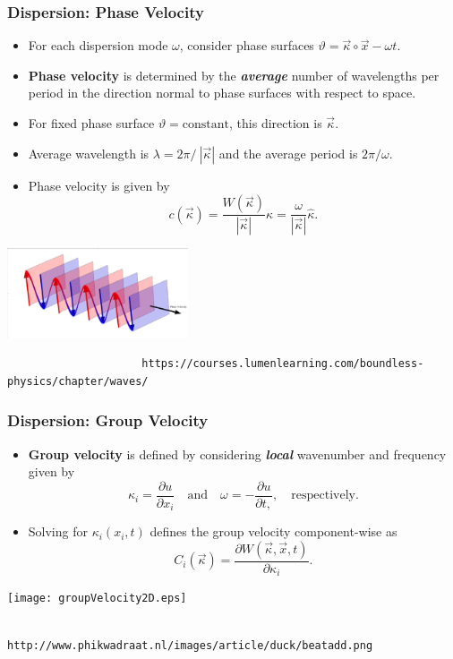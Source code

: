 \documentclass{beamer}
\begin{document}
\begin{frame}[fragile]
\frametitle{\textbf{Dispersion:} Phase Velocity}
\begin{itemize}
\item For each dispersion mode $\omega$, consider phase surfaces $\vartheta=\vec{\kappa}\circ\vec{x}-\omega t$.
\item \textbf{Phase velocity} is determined by the \textbf{\textit{average}} number of wavelengths per period in the direction normal to phase surfaces with respect to space.\item For fixed phase surface $\vartheta=\mbox{constant}$, this direction is $\vec{\kappa}$.
\item Average wavelength is $\lambda=2\pi\slash\ |\vec{\kappa}|$ and the average period is $2\pi\slash\omega$.
\item  Phase velocity is given by$$c(\vec{\kappa})=\frac{W(\vec{\kappa})}{|\vec{\kappa}|}\hat{\kappa}=\frac{\omega}{|\vec{\kappa}|}\hat{\kappa}.$$
\end{itemize}
\hspace{3.6cm}\includegraphics[width=0.4\textwidth]{planeWave.eps}
\tiny{\begin{verbatim}
                     https://courses.lumenlearning.com/boundless-physics/chapter/waves/
\end{verbatim}}
\end{frame}

\begin{frame}[fragile]
\frametitle{Dispersion: Group Velocity}
\begin{itemize}
\item \textbf{Group velocity} is defined by considering \textbf{\textit{local}} wavenumber and frequency given by $$\kappa_i=\frac{\partial u}{\partial x_i}\quad\mbox{and}\quad\omega=-\frac{\partial u}{\partial t,},\quad\mbox{respectively.}$$
\item Solving for $\kappa_i(x_i,t)$ defines the group velocity component-wise as $$C_i(\vec{\kappa})=\frac{\partial W(\vec{\kappa},\vec{x},t)}{\partial\kappa_i}.$$
\end{itemize}
\hspace{2.2cm}
\texttt{[image: groupVelocity2D.eps]}
\tiny{\begin{verbatim}                         http://www.phikwadraat.nl/images/article/duck/beatadd.png\end{verbatim}}
\end{frame}
\end{document}
